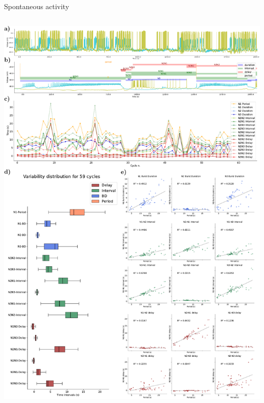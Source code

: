 \documentclass[aspectratio=43]{beamer}
\begin{document}
\begin{frame}{Spontaneous activity}
\begin{columns}
\begin{column}{0.5\textwidth}
			\includegraphics[width=\textwidth]{invariants/data/SUSSEX/prep3/images/3phases/panel_with_intervals.pdf}
		\end{column}
	\end{columns}
\end{frame}
\end{document}
